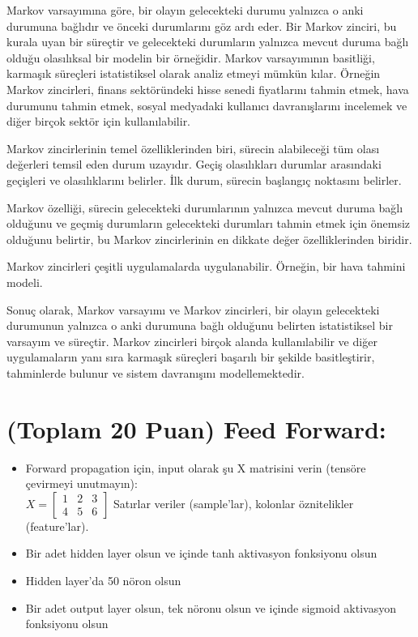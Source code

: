 \documentclass[11pt]{article}
\begin{document}
Markov varsayımına göre, bir olayın gelecekteki durumu yalnızca o anki durumuna bağlıdır ve önceki durumlarını göz ardı eder. Bir Markov zinciri, bu kurala uyan bir süreçtir ve gelecekteki durumların yalnızca mevcut duruma bağlı olduğu olasılıksal bir modelin bir örneğidir.
Markov varsayımının basitliği, karmaşık süreçleri istatistiksel olarak analiz etmeyi mümkün kılar. Örneğin Markov zincirleri, finans sektöründeki hisse senedi fiyatlarını tahmin etmek, hava durumunu tahmin etmek, sosyal medyadaki kullanıcı davranışlarını incelemek ve diğer birçok sektör için kullanılabilir.

Markov zincirlerinin temel özelliklerinden biri, sürecin alabileceği tüm olası değerleri temsil eden durum uzayıdır. Geçiş olasılıkları durumlar arasındaki geçişleri ve olasılıklarını belirler. İlk durum, sürecin başlangıç noktasını belirler.

Markov özelliği, sürecin gelecekteki durumlarının yalnızca mevcut duruma bağlı olduğunu ve geçmiş durumların gelecekteki durumları tahmin etmek için önemsiz olduğunu belirtir, bu Markov zincirlerinin en dikkate değer özelliklerinden biridir.

Markov zincirleri çeşitli uygulamalarda uygulanabilir. Örneğin, bir hava tahmini modeli.

Sonuç olarak, Markov varsayımı ve Markov zincirleri, bir olayın gelecekteki durumunun yalnızca o anki durumuna bağlı olduğunu belirten istatistiksel bir varsayım ve süreçtir. Markov zincirleri birçok alanda kullanılabilir ve diğer uygulamaların yanı sıra karmaşık süreçleri başarılı bir şekilde basitleştirir, tahminlerde bulunur ve sistem davranışını modellemektedir.

\section{(Toplam 20 Puan) Feed Forward:}
 
\begin{itemize}
    \item Forward propagation için, input olarak şu X matrisini verin (tensöre çevirmeyi unutmayın):\\
    $X = \begin{bmatrix}
        1 & 2 & 3\\
        4 & 5 & 6
        \end{bmatrix}$
    Satırlar veriler (sample'lar), kolonlar öznitelikler (feature'lar).
    \item Bir adet hidden layer olsun ve içinde tanh aktivasyon fonksiyonu olsun
    \item Hidden layer'da 50 nöron olsun
    \item Bir adet output layer olsun, tek nöronu olsun ve içinde sigmoid aktivasyon fonksiyonu olsun
\end{itemize}
\end{document}
